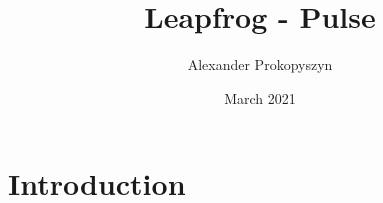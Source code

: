 \documentclass{article}
\title{Leapfrog - Pulse}
\author{Alexander Prokopyszyn}
\date{March 2021}
\begin{document}
\maketitle

\section{Introduction}
\end{document}
